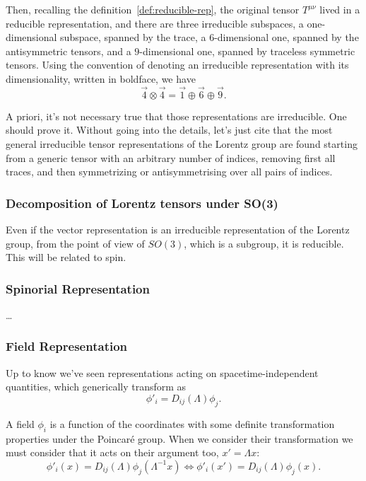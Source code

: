 Then, recalling the definition~\eqref{def:reducible-rep}, the original tensor $T^{\mu\nu}$ lived in a reducible representation, and there are three irreducible subspaces, a one-dimensional subspace, spanned by the trace, a $6$-dimensional one, spanned by the antisymmetric tensors, and a $9$-dimensional one, spanned by traceless symmetric tensors. Using the convention of denoting an irreducible representation with its dimensionality, written in boldface, we have
\begin{equation}
    \vec{4} \otimes \vec{4} = \vec{1} \oplus \vec{6} \oplus \vec{9} .
\end{equation}

A priori, it's not necessary true that those representations are irreducible. One should prove it. Without going into the details, let's just cite that the most general irreducible tensor representations of the Lorentz group are found starting from a generic tensor with an arbitrary number of indices, removing first all traces, and then symmetrizing or antisymmetrising over all pairs of indices.

\color{red}
\subsubsection{Decomposition of Lorentz tensors under SO(3)}
Even if the vector representation is an irreducible representation of the Lorentz group, from the point of view of $SO(3)$, which is a subgroup, it is reducible. This will be related to spin.
\color{black}



\subsubsection{Spinorial Representation}
\dots

\subsubsection{Field Representation}
Up to know we've seen representations acting on spacetime-independent quantities, which generically transform as
\begin{equation}
    \phi'_i  = D_{ij}(\Lambda) \phi_j.
\end{equation}

A field $\phi_i$ is a function of the coordinates with some definite transformation properties under the Poincaré group. When we consider their transformation we must consider that it acts on their argument too, $x' = \Lambda x$:
\begin{equation}
    \phi'_i (x) = D_{ij}(\Lambda) \phi_j(\Lambda^{-1}x) \iff \phi'_i(x') = D_{ij}(\Lambda) \phi_j(x) .
\end{equation}


